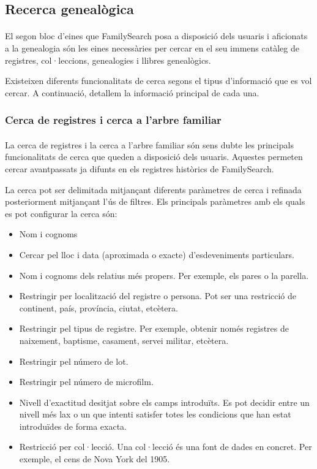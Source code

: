 \subsection{Recerca genealògica}

    \paragraph{}
    El segon bloc d’eines que FamilySearch posa a disposició dels usuaris i aficionats a la genealogia són les eines necessàries per cercar en el seu immens catàleg de registres, col·leccions, genealogies i llibres genealògics.

    Existeixen diferents funcionalitats de cerca segons el tipus d'informació que es vol cercar. A continuació, detallem la informació principal de cada una.

    \subsubsection{Cerca de registres i cerca a l'arbre familiar}

        \paragraph{}
        La cerca de registres i la cerca a l'arbre familiar són sens dubte les principals funcionalitats de cerca que queden a disposició dels usuaris. Aquestes permeten cercar avantpassats ja difunts en els registres històrics de FamilySearch.

        La cerca pot ser delimitada mitjançant diferents paràmetres de cerca i refinada posteriorment mitjançant l’ús de filtres. Els principals paràmetres amb els quals es pot configurar la cerca són:

        \begin{itemize}
            \item Nom i cognoms
            \item Cercar pel lloc i data (aproximada o exacte) d’esdeveniments particulars.
            \item Nom i cognoms dels relatius més propers. Per exemple, els pares o la parella.
            \item Restringir per localització del registre o persona. Pot ser una restricció de continent, país, província, ciutat, etcètera.
            \item Restringir pel tipus de registre. Per exemple, obtenir només registres de nai\-xe\-ment, baptisme, casament, servei militar, etcètera.
            \item Restringir pel número de lot.
            \item Restringir pel número de microfilm.
            \item Nivell d’exactitud desitjat sobre els camps introduïts. Es pot decidir entre un nivell més lax o un que intenti satisfer totes les condicions que han estat introduïdes de forma exacta.
            \item Restricció per col·lecció. Una col·lecció és una font de dades en concret. Per exemple, el cens de Nova York del 1905.
        \end{itemize}

